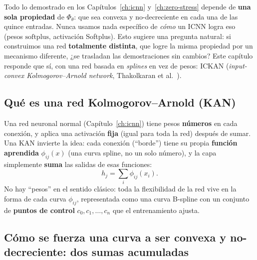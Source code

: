 \documentclass[11pt,a4paper]{article}
\begin{document}
Todo lo demostrado en los Cap\'itulos~\ref{ch:icnn}
y~\ref{ch:zero-stress} depende de \textbf{una sola propiedad} de
$\Phi_\theta$: que sea convexa y no-decreciente en cada una de las
quince entradas. Nunca usamos nada espec\'ifico de \emph{c\'omo} un
ICNN logra eso (pesos $\mathrm{softplus}$, activaci\'on Softplus). Esto
sugiere una pregunta natural: si construimos una red \textbf{totalmente
distinta}, que logre la misma propiedad por un mecanismo diferente,
¿se trasladan las demostraciones sin cambios? Este cap\'itulo responde
que s\'i, con una red basada en \emph{splines} en vez de pesos:
ICKAN (\emph{input-convex Kolmogorov--Arnold network},
Thakolkaran et al.~\cite{Thakolkaran2025}).

\subsection{Qu\'e es una red Kolmogorov--Arnold (KAN)}

Una red neuronal normal (Cap\'itulo~\ref{ch:icnn}) tiene pesos
\textbf{n\'umeros} en cada conexi\'on, y aplica una activaci\'on
\textbf{fija} (igual para toda la red) despu\'es de sumar. Una KAN
invierte la idea: cada conexi\'on (``borde'') tiene su propia
\textbf{funci\'on aprendida} $\phi_{ij}(x)$ (una curva spline, no un
solo n\'umero), y la capa simplemente \textbf{suma} las salidas de esas
funciones:
\[
 h_j=\sum_i\phi_{ij}(x_i).
\]
No hay ``pesos'' en el sentido cl\'asico: toda la flexibilidad de la
red vive en la forma de cada curva $\phi_{ij}$, representada como una
curva B-spline con un conjunto de \textbf{puntos de control}
$c_0,c_1,\dots,c_n$ que el entrenamiento ajusta.

\subsection{C\'omo se fuerza una curva a ser convexa y no-decreciente: dos sumas acumuladas}
\end{document}

